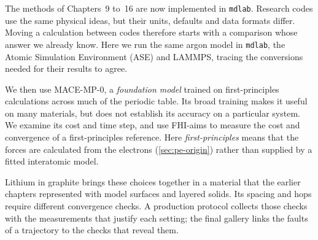 The methods of Chapters~9 to~16 are now implemented in \texttt{mdlab}.
Research codes use the same physical ideas, but their units, defaults
and data formats differ. Moving a calculation between codes therefore
starts with a comparison whose answer we already know. Here we run the
same argon model in \texttt{mdlab}, the Atomic Simulation Environment
(ASE)\cite{Larsen2017} and LAMMPS\cite{Thompson2022}, tracing the
conversions needed for their results to agree.

We then use MACE-MP-0\cite{Batatia2025}, a \emph{foundation model}
trained on first-principles calculations across much of the periodic
table. Its broad training makes it useful on many materials, but does
not establish its accuracy on a particular system. We examine its cost
and time step, and use FHI-aims\cite{Blum2009} to measure the cost and
convergence of a first-principles reference. Here \emph{first-principles}
means that the forces are calculated from the electrons
(\cref{sec:pe-origin}) rather than supplied by a fitted interatomic model.

Lithium in graphite brings these choices together in a material that the
earlier chapters represented with model surfaces and layered solids.
Its spacing and hops require different convergence checks. A production
protocol collects those checks with the measurements that justify each
setting; the final gallery links the faults of a trajectory to the
checks that reveal them.
